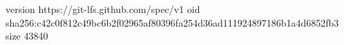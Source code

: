 version https://git-lfs.github.com/spec/v1
oid sha256:c42c0f812c49bc6b2f02965af80396fa254d36ad111924897186b1a4d6852fb3
size 43840
